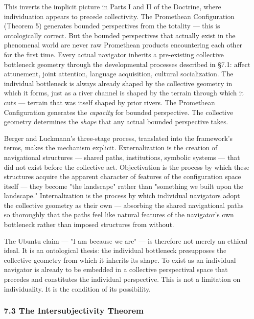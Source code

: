 This inverts the implicit picture in Parts I and II of the Doctrine, where individuation appears to precede collectivity. The Promethean Configuration (Theorem 5) generates bounded perspectives from the totality — this is ontologically correct. But the bounded perspectives that actually exist in the phenomenal world are never raw Promethean products encountering each other for the first time. Every actual navigator inherits a pre-existing collective bottleneck geometry through the developmental processes described in §7.1: affect attunement, joint attention, language acquisition, cultural socialization. The individual bottleneck is always already shaped by the collective geometry in which it forms, just as a river channel is shaped by the terrain through which it cuts — terrain that was itself shaped by prior rivers. The Promethean Configuration generates the \textit{capacity} for bounded perspective. The collective geometry determines the \textit{shape} that any actual bounded perspective takes.


Berger and Luckmann's three-stage process, translated into the framework's terms, makes the mechanism explicit. Externalization is the creation of navigational structures — shared paths, institutions, symbolic systems — that did not exist before the collective act. Objectivation is the process by which these structures acquire the apparent character of features of the configuration space itself — they become "the landscape" rather than "something we built upon the landscape." Internalization is the process by which individual navigators adopt the collective geometry as their own — absorbing the shared navigational paths so thoroughly that the paths feel like natural features of the navigator's own bottleneck rather than imposed structures from without.


The Ubuntu claim — "I am because we are" — is therefore not merely an ethical ideal. It is an ontological thesis: the individual bottleneck presupposes the collective geometry from which it inherits its shape. To exist as an individual navigator is already to be embedded in a collective perspectival space that precedes and constitutes the individual perspective. This is not a limitation on individuality. It is the condition of its possibility.


\bigskip\noindent\makebox[\textwidth]{\color{rulegray}\rule{5cm}{0.3pt}}\bigskip


\subsubsection*{7.3 The Intersubjectivity Theorem}


